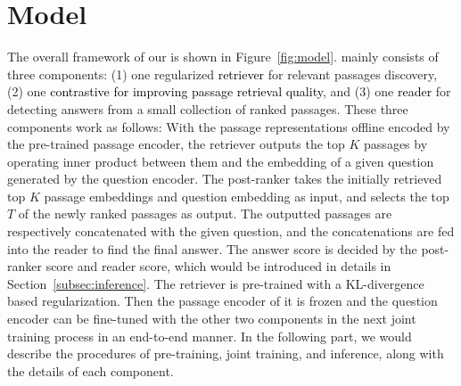 
\section{Model}\label{sec:model}
The overall framework of our {\modelname} is shown in Figure~\ref{fig:model}.
{\modelname} mainly consists of three components: (1) one regularized \textcolor{black}{retriever} for relevant passages discovery, (2) one \textcolor{black}{contrastive {\rerankname} for improving passage retrieval quality}, and (3) one \textcolor{black}{reader} for detecting answers from a small collection of ranked passages. These three components work as follows: With the passage representations offline encoded by the pre-trained passage encoder, the retriever outputs the top $K$ passages by operating inner product between them and the embedding of a given question generated by the question encoder. The post-ranker takes the initially retrieved top $K$ passage embeddings and question embedding as input, and selects the top $T$ of the newly ranked passages as output. The outputted passages are respectively concatenated with the given question, and the concatenations are fed into the reader to find the final answer. 
The answer score is decided by the post-ranker score and reader score, which would be introduced in details in Section~\ref{subsec:inference}. 
The retriever is pre-trained with a KL-divergence based regularization. Then the passage encoder of it is frozen and the question encoder can be fine-tuned with the other two components in the next joint training process in an end-to-end manner.
In the following part, we would describe the procedures of pre-training, joint training, and inference, along with the details of each component.


